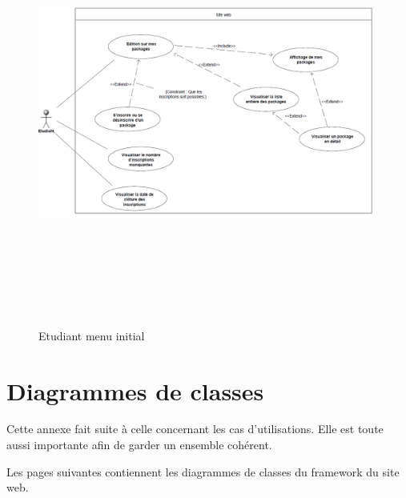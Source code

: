     \begin{figure}[h]
        \begin{center}
            \includegraphics[height=14cm,width=15cm]{images/uml/etudiantMenuInitial.png} 
        \end{center}

        \caption{Etudiant menu initial}
        \label{Etudiant menu initial}
    \end{figure}






\chapter{Diagrammes de classes}
    Cette annexe fait suite à celle concernant les cas d'utilisations. Elle est 
toute aussi importante afin de garder un ensemble cohérent.

    Les pages suivantes contiennent les diagrammes de classes du framework du site
web.

